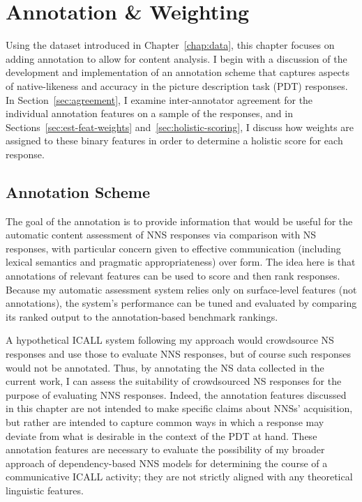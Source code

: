 \chapter{Annotation \& Weighting}
\label{chap:annotation}

Using the dataset introduced in Chapter~\ref{chap:data}, this chapter focuses on adding annotation to allow for content analysis. I begin with a discussion of the development and implementation of an annotation scheme that captures aspects of native-likeness and accuracy in the picture description task (PDT) responses. In Section~\ref{sec:agreement}, I examine inter-annotator agreement for the individual annotation features on a sample of the responses, and in Sections~\ref{sec:est-feat-weights} and~\ref{sec:holistic-scoring}, I discuss how weights are assigned to these binary features in order to determine a holistic score for each response.

\section{Annotation Scheme}
\label{sec:scheme}
The goal of the annotation is to provide information that would be useful for the automatic content assessment of NNS responses via comparison with NS responses, with particular concern given to effective communication (including lexical semantics and pragmatic appropriateness) over form. The idea here is that annotations of relevant features can be used to score and then rank responses. Because my automatic assessment system relies only on surface-level features (not annotations), the system's performance can be tuned and evaluated by comparing its ranked output to the annotation-based benchmark rankings.
%


A hypothetical ICALL system following my approach would crowdsource NS responses and use those to evaluate NNS responses, but of course such responses would not be annotated. Thus, by annotating the NS data collected in the current work, I can assess the suitability of crowdsourced NS responses for the purpose of evaluating NNS responses.  Indeed, the annotation features discussed in this chapter are not intended to make specific claims about NNSs' acquisition, but rather are intended to capture common ways in which a response may deviate from what is desirable in the context of the PDT at hand. These annotation features are necessary to evaluate the possibility of my broader approach of dependency-based NNS models for determining the course of a communicative ICALL activity; they are not strictly aligned with any theoretical linguistic features.

